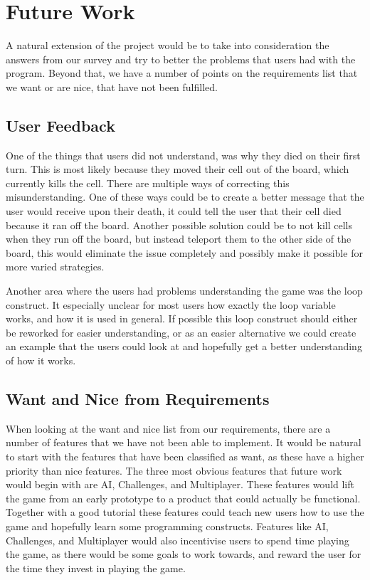 \section{Future Work}
A natural extension of the project would be to take into consideration the answers from our survey and try to better the problems that users had with the program. Beyond that, we have a number of points on the requirements list that we want or are nice, that have not been fulfilled.

\subsection{User Feedback}
One of the things that users did not understand, was why they died on their first turn. This is most likely because they moved their cell out of the board, which currently kills the cell. There are multiple ways of correcting this misunderstanding. One of these ways could be to create a better message that the user would receive upon their death, it could tell the user that their cell died because it ran off the board. Another possible solution could be to not kill cells when they run off the board, but instead teleport them to the other side of the board, this would eliminate the issue completely and possibly make it possible for more varied strategies.\newline

Another area where the users had problems understanding the game was the loop construct. It especially unclear for most users how exactly the loop variable works, and how it is used in general. If possible this loop construct should either be reworked for easier understanding, or as an easier alternative we could create an example that the users could look at and hopefully get a better understanding of how it works.

\subsection{Want and Nice from Requirements}
When looking at the want and nice list from our requirements, there are a number of features that we have not been able to implement. It would be natural to start with the features that have been classified as want, as these have a higher priority than nice features. The three most obvious features that future work would begin with are AI, Challenges, and Multiplayer. These features would lift the game from an early prototype to a product that could actually be functional. Together with a good tutorial these features could teach new users how to use the game and hopefully learn some programming constructs. Features like AI, Challenges, and Multiplayer would also incentivise users to spend time playing the game, as there would be some goals to work towards, and reward the user for the time they invest in playing the game.

